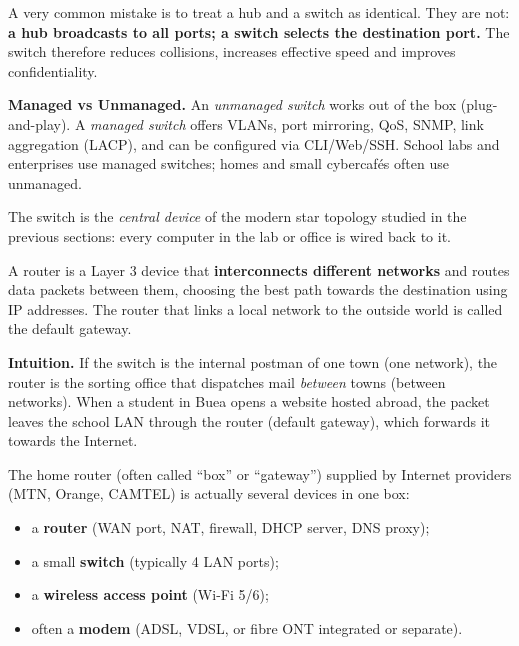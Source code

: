 \documentclass[11pt]{article}
\newcommand{\cle}[1]{{\popxbold\color{popdark}#1}}
\newcounter{popsec}
\newcounter{popsub}
\newcommand{\courssub}[1]{%
  \stepcounter{popsub}%
  \par\vspace{9pt}\noindent{\popxbold\fontsize{11.5}{13}\selectfont\color{popink}{\color{poporange}\thepopsec.\thepopsub}\hspace{6pt}#1}\par\nopagebreak\vspace{4pt}
}
\begin{document}
\begin{attention}
A very common mistake is to treat a hub and a switch as identical. They are not: \textbf{a hub broadcasts to all ports; a switch selects the destination port.} The switch therefore reduces collisions, increases effective speed and improves confidentiality.
\end{attention}

\textbf{Managed vs Unmanaged.} An \emph{unmanaged switch} works out of the box (plug-and-play). A \emph{managed switch} offers VLANs, port mirroring, QoS, SNMP, link aggregation (LACP), and can be configured via CLI/Web/SSH. School labs and enterprises use managed switches; homes and small cybercafés often use unmanaged.

The switch is the \emph{central device} of the modern star topology studied in the previous sections: every computer in the lab or office is wired back to it.

\courssub{The Router}

\begin{definition}[Router]
A \cle{router} is a Layer 3 device that \textbf{interconnects different networks} and routes data packets between them, choosing the best path towards the destination using \cle{IP addresses}. The router that links a local network to the outside world is called the \cle{default gateway}.
\end{definition}

\textbf{Intuition.} If the switch is the internal postman of one town (one network), the router is the sorting office that dispatches mail \emph{between} towns (between networks). When a student in Buea opens a website hosted abroad, the packet leaves the school LAN through the router (default gateway), which forwards it towards the Internet.

The \cle{home router} (often called ``box'' or ``gateway'') supplied by Internet providers (MTN, Orange, CAMTEL) is actually several devices in one box:
\begin{itemize}
\item a \textbf{router} (WAN port, NAT, firewall, DHCP server, DNS proxy);
\item a small \textbf{switch} (typically 4 LAN ports);
\item a \textbf{wireless access point} (Wi-Fi 5/6);
\item often a \textbf{modem} (ADSL, VDSL, or fibre ONT integrated or separate).
\end{itemize}
\end{document}
